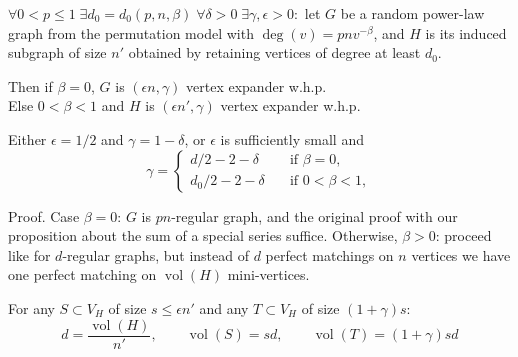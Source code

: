 \documentclass{beamer}
\DeclareMathOperator*{\vol}{vol}
\newcommand{\autotitle}{\secname\ifdefempty{\subsecname}{}{~--- \subsecname}}
\newcommand{\smalldisplayskips}{
    \setlength{\abovedisplayskip}{3pt}
    \setlength{\belowdisplayskip}{3pt}}
\begin{document}
\begin{frame}{\autotitle}
    \smalldisplayskips
    \begin{theorem}
        $\forall 0<p\leq 1\;\exists d_0=d_0(p,n,\beta)\;\forall\delta>0\;\exists\gamma,\epsilon>0:$
        let $G$ be a random power-law graph from the permutation model with $\deg(v)=pnv^{-\beta}$,
        and $H$ is its induced subgraph of size $n'$ obtained by retaining vertices of degree at least $d_0$.
        
        Then if $\beta=0$, $G$ is $(\epsilon n,\gamma)$ vertex expander w.h.p.\\
        Else $0<\beta<1$ and $H$ is $(\epsilon n',\gamma)$ vertex expander w.h.p.

        Either $\epsilon=1/2$ and $\gamma=1-\delta$,
        or $\epsilon$ is sufficiently small and
        \begin{equation*}
            \gamma=\begin{cases}
                d/2-2-\delta & \quad \text{if } \beta=0,\\
                d_0/2-2-\delta & \quad \text{if } 0<\beta<1,
            \end{cases}
        \end{equation*}
    \end{theorem}
\end{frame}

\begin{frame}{\autotitle}
    \begin{block}{Proof.}
        Case $\beta=0$: $G$ is $pn$-regular graph, and the original proof
        with our proposition about the sum of a special series suffice.
        Otherwise, $\beta>0$: proceed like for $d$-regular graphs,
        but instead of $d$ perfect matchings on $n$ vertices
        we have one perfect matching on $\vol(H)$ mini-vertices.
        
        For any $S\subset V_H$ of size $s\leq\epsilon n'$
        and any $T\subset V_H$ of size $(1+\gamma)s$:
        \begin{equation*}
            d=\frac{\vol(H)}{n'},
            \qquad\vol(S)=sd,
            \qquad\vol(T)=(1+\gamma)sd
        \end{equation*}
    \end{block}
\end{frame}
\end{document}
